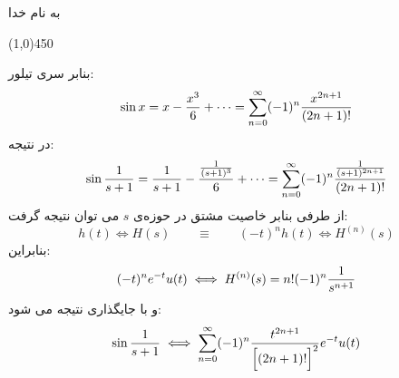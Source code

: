 \documentclass[50pt]{article}
\newcommand{\hl}{
\begin{center}
\line(1,0){450}
\end{center}}
\begin{document}





\setLTR 




\begin{RTL}
\Large{








\begin{center}
به نام خدا


\end{center}
\hl
بنابر سری تیلور:
$$
\sin x=x-{x^3\over 6}+\cdots =\sum_{n=0}^{\infty}(-1)^n{x^{2n+1}\over (2n+1)!}
$$
در نتیجه:
$$
\sin {1\over s+1}={1\over s+1}-{{1\over (s+1)^3}\over 6}+\cdots =\sum_{n=0}^{\infty}(-1)^n{{1\over (s+1)^{2n+1}}\over (2n+1)!}
$$
از طرفی بنابر خاصیت مشتق در حوزه‌ی $s$ می توان نتیجه گرفت:
\[
h(t)\iff H(s)\qquad\equiv \qquad(-t)^n h(t)\iff H^{(n)}(s)
\]
بنابراین:
\[
(-t)^n e^{-t}u(t)\iff H^{(n)}(s)=n!(-1)^n {1\over s^{n+1}}
\]
و با جایگذاری نتیجه می شود:
$$
\sin{1\over s+1}\iff \sum_{n=0}^{\infty} (-1)^n{t^{2n+1}\over \Big[(2n+1)!\Big]^2}e^{-t}u(t)
$$
}





\end{RTL}
\end{document}

